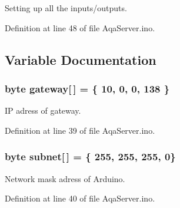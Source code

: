 Setting up all the inputs/outputs. 



Definition at line 48 of file Aqa\+Server.\+ino.



\subsection{Variable Documentation}
\hypertarget{_aqa_server_8ino_a50d8813b28b1fc9d3695b4c352fc1f73}{
\subsubsection[{gateway}]{\setlength{\rightskip}{0pt plus 5cm}byte gateway\mbox{[}$\,$\mbox{]} = \{ 10, 0, 0, 138 \}}}\label{_aqa_server_8ino_a50d8813b28b1fc9d3695b4c352fc1f73}


I\+P adress of gateway. 



Definition at line 39 of file Aqa\+Server.\+ino.

\hypertarget{_aqa_server_8ino_a5785acd9d4432010fb73dc54d352ccc3}{
\subsubsection[{subnet}]{\setlength{\rightskip}{0pt plus 5cm}byte subnet\mbox{[}$\,$\mbox{]} = \{ 255, 255, 255, 0\}}}\label{_aqa_server_8ino_a5785acd9d4432010fb73dc54d352ccc3}


Network mask adress of Arduino. 



Definition at line 40 of file Aqa\+Server.\+ino.

